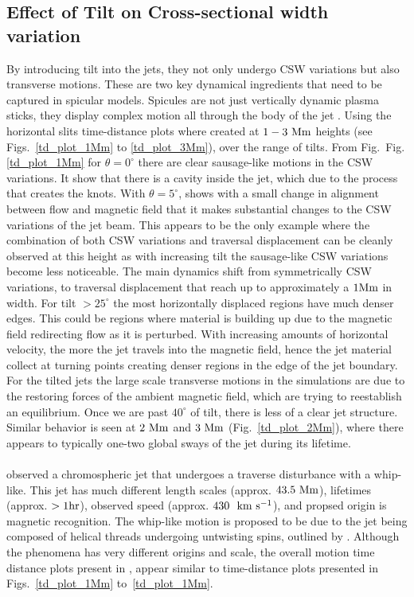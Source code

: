 \documentclass[12pt]{ociamthesis}
\newcommand{\fref}[1]{Fig. \eqref{#1}}
\newcommand{\kms}{~\rm{km ~s^{-1}}}
\newcommand{\np}{\\ \\}
\newcommand{\degs}{^{\circ}}
\begin{document}
\subsection{Effect of Tilt on Cross-sectional width variation}
\label{subsec:oscillating}
By introducing tilt into the jets, they not only undergo CSW variations but also transverse motions. These are two key dynamical ingredients that need to be captured in spicular models. Spicules are not just vertically dynamic plasma sticks, they display complex motion all through the body of the jet \citep{Sharma2018ApJ85361S}. Using the horizontal slits time-distance plots where created at $1-3~\rm{Mm}$ heights (see Figs.~\ref{td_plot_1Mm} to \ref{td_plot_3Mm}), over the range of tilts. From Fig.~\fref{td_plot_1Mm} for $\theta=0^{\circ}$ there are clear sausage-like motions in the CSW variations. It show that there is a cavity inside the jet, which due to the process that creates the knots. With $\theta=5^{\circ}$, shows with a small change in alignment between flow and magnetic field that it makes substantial changes to the CSW variations of the jet beam. This appears to be the only example where the combination of both CSW variations and traversal displacement can be cleanly observed at this height as with increasing tilt the sausage-like CSW variations become less noticeable. The main dynamics shift from symmetrically CSW variations, to traversal displacement that reach up to approximately a $1\rm{Mm}$ in width. For tilt $>25\degs$ the most horizontally displaced regions have much denser edges. This could be regions where material is building up due to the magnetic field redirecting flow as it is perturbed. With increasing amounts of horizontal velocity, the more the jet travels into the magnetic field, hence the jet material collect at turning points creating denser regions in the edge of the jet boundary. For the tilted jets the large scale transverse motions in the simulations are due to the restoring forces of the ambient magnetic field, which are trying to reestablish an equilibrium. Once we are past $40\degs$ of tilt, there is less of a clear jet structure. Similar behavior is seen at $2~\rm{Mm}$ and $3~\rm{Mm}$ (Fig.~\ref{td_plot_2Mm}), where there appears to typically one-two global sways of the jet during its lifetime. \np
%
\cite{Liu2009ApJ707L37L} observed a chromospheric jet that undergoes a traverse disturbance with a whip-like. This jet has much different length scales (approx. $43.5~\rm{Mm}$), lifetimes (approx. $>1\rm{hr}$), observed speed (approx. $430~\kms$), and propsed origin is magnetic recognition. The whip-like motion is proposed to be due to the jet being composed of helical threads undergoing untwisting spins, outlined by \cite{Shibata1985PASJ3731S,Shibata1986SoPh103299S,Canfield1996ApJ4641016C}. Although the phenomena has very different origins and scale, the overall motion time distance plots present in \cite{Liu2009ApJ707L37L}, appear similar to time-distance plots presented in Figs.~\ref{td_plot_1Mm} to~\ref{td_plot_1Mm}.   \np
\end{document}
